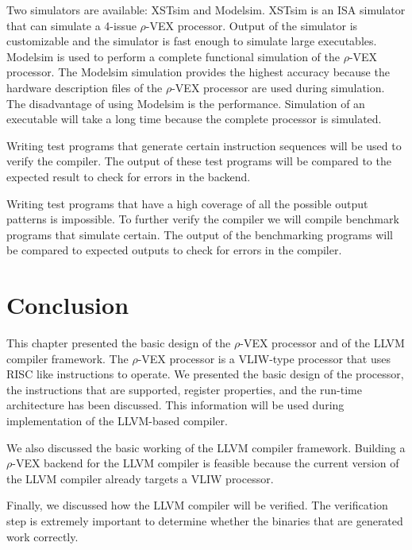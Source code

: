 Two simulators are available: XSTsim and Modelsim. XSTsim is an ISA simulator that can simulate a 4-issue $\rho$-VEX processor. Output of the simulator is customizable and the simulator is fast enough to simulate large executables. Modelsim is used to perform a complete functional simulation of the $\rho$-VEX processor. The Modelsim simulation provides the highest accuracy because the hardware description files of the $\rho$-VEX processor are used during simulation. The disadvantage of using Modelsim is the performance. Simulation of an executable will take a long time because the complete processor is simulated.

Writing test programs that generate certain instruction sequences will be used to verify the compiler. The output of these test programs will be compared to the expected result to check for errors in the backend.

Writing test programs that have a high coverage of all the possible output patterns is impossible. To further verify the compiler we will compile benchmark programs that simulate certain. The output of the benchmarking programs will be compared to expected outputs to check for errors in the compiler.

\section{Conclusion}
This chapter presented the basic design of the $\rho$-VEX processor and of the LLVM compiler framework. The $\rho$-VEX processor is a VLIW-type processor that uses RISC like instructions to operate. We presented the basic design of the processor, the instructions that are supported, register properties, and the run-time architecture has been discussed. This information will be used during implementation of the LLVM-based compiler.

We also discussed the basic working of the LLVM compiler framework. Building a $\rho$-VEX backend for the LLVM compiler is feasible because the current version of the LLVM compiler already targets a VLIW processor. 

Finally, we discussed how the LLVM compiler will be verified. The verification step is extremely important to determine whether the binaries that are generated work correctly.

\acresetall

